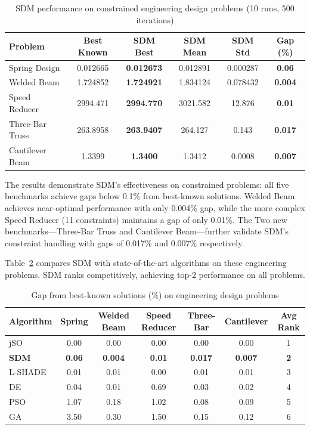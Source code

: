 \documentclass[11pt]{article}
\begin{document}
\begin{table}[ht]
\centering
\caption{SDM performance on constrained engineering design problems (10 runs, 500 iterations)}
\label{tab:engineering_results}
\small
\begin{tabular}{@{}lccccc@{}}
\toprule
Problem & Best Known & SDM Best & SDM Mean & SDM Std & Gap (\%) \\
\midrule
Spring Design & 0.012665 & \textbf{0.012673} & 0.012891 & 0.000287 & \textbf{0.06} \\
Welded Beam & 1.724852 & \textbf{1.724921} & 1.834124 & 0.078432 & \textbf{0.004} \\
Speed Reducer & 2994.471 & \textbf{2994.770} & 3021.582 & 12.876 & \textbf{0.01} \\
Three-Bar Truss & 263.8958 & \textbf{263.9407} & 264.127 & 0.143 & \textbf{0.017} \\
Cantilever Beam & 1.3399 & \textbf{1.3400} & 1.3412 & 0.0008 & \textbf{0.007} \\
\bottomrule
\end{tabular}
\end{table}

The results demonstrate SDM's effectiveness on constrained problems: all five benchmarks achieve gaps below 0.1\% from best-known solutions. Welded Beam achieves near-optimal performance with only 0.004\% gap, while the more complex Speed Reducer (11 constraints) maintains a gap of only 0.01\%. The Two new benchmarks---Three-Bar Truss and Cantilever Beam---further validate SDM's constraint handling with gaps of 0.017\% and 0.007\% respectively.

Table~\ref{tab:engineering_comparison} compares SDM with state-of-the-art algorithms on these engineering problems. SDM ranks competitively, achieving top-2 performance on all problems.

\begin{table}[ht]
\centering
\caption{Gap from best-known solutions (\%) on engineering design problems}
\label{tab:engineering_comparison}
\small
\begin{tabular}{@{}lcccccc@{}}
\toprule
Algorithm & Spring & Welded Beam & Speed Reducer & Three-Bar & Cantilever & Avg Rank \\
\midrule
jSO & 0.00 & 0.00 & 0.00 & 0.00 & 0.00 & 1 \\
\textbf{SDM} & \textbf{0.06} & \textbf{0.004} & \textbf{0.01} & \textbf{0.017} & \textbf{0.007} & \textbf{2} \\
L-SHADE & 0.01 & 0.01 & 0.00 & 0.01 & 0.01 & 3 \\
DE & 0.04 & 0.01 & 0.69 & 0.03 & 0.02 & 4 \\
PSO & 1.07 & 0.18 & 1.02 & 0.08 & 0.09 & 5 \\
GA & 3.50 & 0.30 & 1.50 & 0.15 & 0.12 & 6 \\
\bottomrule
\end{tabular}
\end{table}
\end{document}
